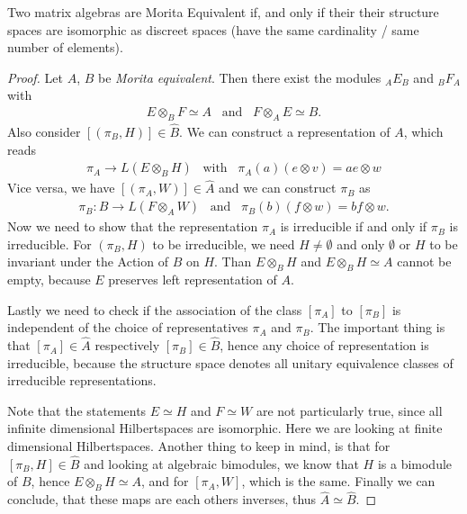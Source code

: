 \begin{mylemma}
    Two matrix algebras are Morita Equivalent if, and only if their their structure spaces
    are isomorphic as discreet spaces (have the same cardinality / same number
    of elements).
\end{mylemma}
\begin{proof}
    Let $A$, $B$ be \textit{Morita equivalent}. Then there exist the modules
    $_A E_B$ and $_B F_A$ with
    \begin{align}
        E \otimes _B F \simeq A \;\;\; \text{and} \;\;\; F \otimes _A E \simeq
        B.
    \end{align}
    Also consider $[(\pi _B, H)] \in \hat{B}$. We can construct a
    representation of $A$, which reads
    \begin{align}
        \pi _A \rightarrow L(E \otimes _B H)\;\;\; \text{with} \;\;\; \pi _A(a)
        (e \otimes v) = a e \otimes w
    \end{align}
    Vice versa, we have $[(\pi _A, W)] \in \hat{A}$ and we can construct $\pi _B$
    as
    \begin{align}
        \pi _B: B \rightarrow L(F \otimes _A W) \;\;\; \text{and}\;\;\; \pi
        _B(b) (f\otimes w) = bf\otimes w.
    \end{align}
    Now we need to show that the representation $\pi _A$ is irreducible if and
    only if $\pi _B$ is irreducible. For $(\pi _B, H)$ to be irreducible, we
    need $H \neq \emptyset$ and only $\emptyset$ or $H$ to be invariant under
    the Action of $B$ on $H$. Than $E\otimes _B H$ and $E\otimes _B H \simeq A$
    cannot be empty, because $E$ preserves left representation of $A$.

    Lastly we need to check if the association of the class $[\pi _A]$ to $[\pi
    _B]$ is independent of the choice of representatives $\pi _A$ and $\pi _B$.
    The important thing is that $[\pi _A] \in \hat{A}$ respectively $[\pi _B] \in
    \hat{B}$, hence any choice of representation is irreducible, because the
    structure space denotes all unitary equivalence classes of irreducible
    representations.

    Note that the statements $E \simeq H$ and $F \simeq W$ are not particularly
    true, since all infinite dimensional Hilbertspaces are isomorphic.  Here
    we are looking at finite dimensional Hilbertspaces. Another thing to keep
    in mind, is that for $[\pi _B, H] \in \hat{B}$ and looking at algebraic
    bimodules, we know that $H$ is a bimodule of $B$, hence $E \otimes _B
    H\simeq A$, and for $[\pi _A, W]$, which is the same.
    Finally we can conclude, that these maps are each others inverses, thus
    $\hat{A} \simeq \hat{B}$.
\end{proof}

